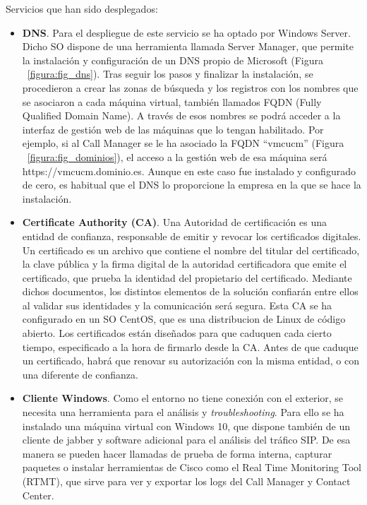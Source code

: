 \documentclass[a4paper, 12pt]{book}
\begin{document}
Servicios que han sido desplegados:
\begin{itemize}
  \item \textbf{DNS}. Para el despliegue de este servicio se ha optado por Windows Server. Dicho SO dispone de una herramienta llamada Server Manager, que permite la instalación y configuración de un DNS propio de Microsoft (Figura ~\ref{figura:fig_dns}). Tras seguir los pasos y finalizar la instalación, se procedieron a crear las zonas de búsqueda y los registros con los nombres que se asociaron a cada máquina virtual, también llamados FQDN (Fully Qualified Domain Name). A través de esos nombres se podrá acceder a la interfaz de gestión web de las máquinas que lo tengan habilitado. Por ejemplo, si al Call Manager se le ha asociado la FQDN ``vmcucm'' (Figura ~\ref{figura:fig_dominios}), el acceso a la gestión web de esa máquina será https://vmcucm.dominio.es. Aunque en este caso fue instalado y configurado de cero, es habitual que el DNS lo proporcione la empresa en la que se hace la instalación.
  \item \textbf{Certificate Authority (CA)}. Una Autoridad de certificación es una entidad de confianza, responsable de emitir y revocar los certificados digitales. Un certificado es un archivo que contiene el nombre del titular del certificado, la clave pública y la firma digital de la autoridad certificadora que emite el certificado, que prueba la identidad del propietario del certificado. 
  Mediante dichos documentos, los distintos elementos de la solución confiarán entre ellos al validar sus identidades y la comunicación será segura.
  Esta CA se ha configurado en un SO CentOS, que es una distribucion de Linux de código abierto.
  Los certificados están diseñados para que caduquen cada cierto tiempo, especificado a la hora de firmarlo desde la CA. Antes de que caduque un certificado, habrá que renovar su autorización con la misma entidad, o con una diferente de confianza.
  \item \textbf{Cliente Windows}. Como el entorno no tiene conexión con el exterior, se necesita una herramienta para el análisis y \emph{troubleshooting}. Para ello se ha instalado una máquina virtual con Windows 10, que dispone también de un cliente de jabber y software adicional para el análisis del tráfico SIP. De esa manera se pueden hacer llamadas de prueba de forma interna, capturar paquetes o instalar herramientas de Cisco como el Real Time Monitoring Tool (RTMT), que sirve para ver y exportar los logs del Call Manager y Contact Center.
\end{itemize}
\end{document}
